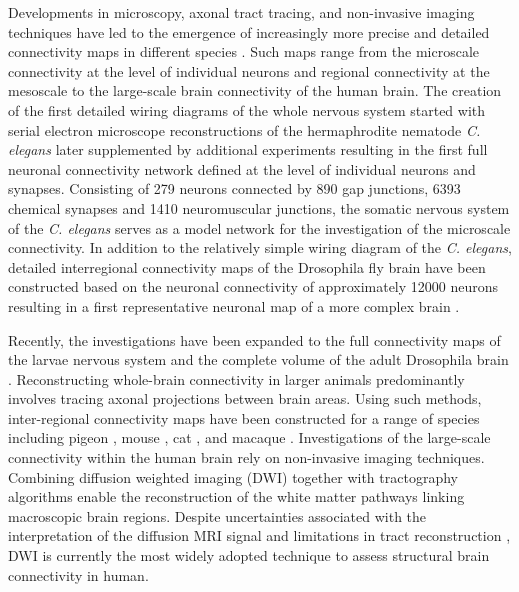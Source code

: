 Developments in microscopy, axonal tract tracing, and non-invasive imaging techniques have led to the emergence of increasingly more precise and detailed connectivity maps in different species \citep{Bota2015,Chiang2011a,Oh2014,Scannell1999,Shanahan2013,Stephan2001,VanEssen2013,White1986}. Such maps range from the microscale connectivity at the level of individual neurons and regional connectivity at the mesoscale to the large-scale brain connectivity of the human brain. The creation of the first detailed wiring diagrams of the whole nervous system started with serial electron microscope reconstructions of the hermaphrodite nematode \textit{C. elegans} \citep{White1986} later supplemented by additional experiments \citep{Varshney2011} resulting in the first full neuronal connectivity network defined at the level of individual neurons and synapses. Consisting of 279 neurons connected by 890 gap junctions, 6393 chemical synapses and 1410 neuromuscular junctions, the somatic nervous system of the \textit{C. elegans} serves as a model network for the investigation of the microscale connectivity. In addition to the relatively simple wiring diagram of the \textit{C. elegans}, detailed interregional connectivity maps of the Drosophila fly brain have been constructed based on the neuronal connectivity of approximately \num{12000} neurons resulting in a first representative neuronal map of a more complex brain \citep{Chiang2011a}.

Recently, the investigations have been expanded to the full connectivity maps of the larvae nervous system \citep{Ohyama2015} and the complete volume of the adult Drosophila brain \citep{Zheng2018}. Reconstructing whole-brain connectivity in larger animals predominantly involves tracing axonal projections between brain areas. Using such methods, inter-regional connectivity maps have been constructed for a range of species including pigeon \citep{Shanahan2013}, mouse \citep{Oh2014}, cat \citep{Scannell1995}, and macaque \citep{Harriger2012}. Investigations of the large-scale connectivity within the human brain rely on non-invasive imaging techniques. Combining diffusion weighted imaging (DWI) together with tractography algorithms \citep{Jbabdi2011} enable the reconstruction of the white matter pathways linking macroscopic brain regions. Despite uncertainties associated with the interpretation of the diffusion MRI signal and limitations in tract reconstruction \citep{Jones2010,Jones2013,Thomas2014}, DWI is currently the most widely adopted technique to assess structural brain connectivity in human.

